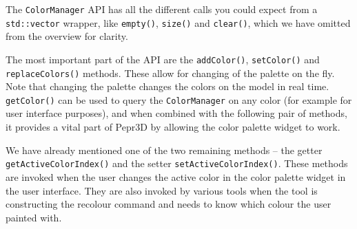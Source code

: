 The \texttt{ColorManager} API has all the different calls you could expect from a \texttt{std::vector} wrapper, like \texttt{empty()}, \texttt{size()} and \texttt{clear()}, which we have omitted from the overview for clarity.

The most important part of the API are the \texttt{addColor()}, \texttt{setColor()} and \texttt{replaceColors()} methods. These allow for changing of the palette on the fly. Note that changing the palette changes the colors on the model in real time. \texttt{getColor()} can be used to query the \texttt{ColorManager} on any color (for example for user interface purposes), and when combined with the following pair of methods, it provides a vital part of Pepr3D by allowing the color palette widget to work.

We have already mentioned one of the two remaining methods -- the getter \texttt{getActiveColorIndex()} and the setter \texttt{setActiveColorIndex()}. These methods are invoked when the user changes the active color in the color palette widget in the user interface. They are also invoked by various tools when the tool is constructing the recolour command and needs to know which colour the user painted with.